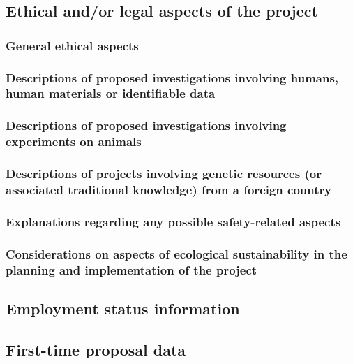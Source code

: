 \documentclass[english, 53.01]{proposal}
\begin{document}
\subsection{Ethical and/or legal aspects of the project}

\subsubsection{General ethical aspects}

\subsubsection{Descriptions of proposed investigations involving humans, human materials or identifiable data}

\subsubsection{Descriptions of proposed investigations involving experiments on animals}

\subsubsection{Descriptions of projects involving genetic resources (or associated traditional knowledge) from a foreign country}

\subsubsection{Explanations regarding any possible safety-related aspects}



\subsubsection{Considerations on aspects of ecological sustainability in the planning and implementation of the project}

\subsection{Employment status information}

\subsection{First-time proposal data}
\end{document}
